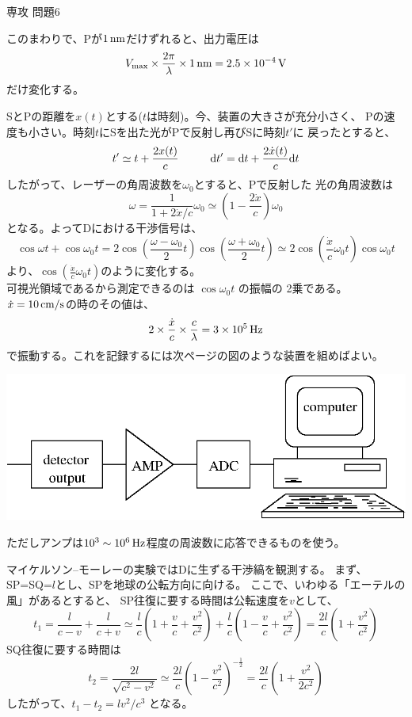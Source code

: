 \documentclass[fleqn]{jbook}
\begin{document}
\begin{answer}{専攻 問題6}{}
\begin{subanswers}
  このまわりで、Pが$1\,{\rm nm}$だけずれると、出力電圧は
%
  \[ V_{\rm max} \times \frac{2\pi}{\lambda} 
     \times 1\,{\rm nm} = 2.5\times 10^{-4} \,{\rm V} \]
%
  だけ変化する。 



\SubAnswer
  SとPの距離を$x(t)$とする($t$は時刻)。今、装置の大きさが充分小さく、
  Pの速度も小さい。時刻$t$にSを出た光がPで反射し再びSに時刻$t'$に
  戻ったとすると、
%
  \[ t' \simeq t + \frac{2x(t)}{c} \hspace{10mm}%
     \d{t}' = \d{t}+\frac{2\dot{x}(t)}{c}\d{t} \]
%
  したがって、レーザーの角周波数を$\omega_{0}$とすると、Pで反射した
  光の角周波数は
%
  \[ \omega = \frac{1}{1+2\dot{x}/c} \omega_{0} \simeq%
              \left(1-\frac{2\dot{x}}{c} \right) \omega_{0} \]
%
  となる。よってDにおける干渉信号は、
%
  \[ \cos \omega t + \cos \omega_{0} t%
       = 2\cos{\left(\frac{\omega-\omega_{0}}{2}t\right)}%
          \cos{\left(\frac{\omega+\omega_{0}}{2}t\right)}%
  \simeq 2\cos{\left(\frac{\dot{x}}{c}\omega_{0}t\right)}%
          \cos{\omega_{0}t} \]
%
  より、$\cos{(\frac{\dot{x}}{c}\omega_{0}t)}$のように変化する。\\
%
  可視光領域であるから測定できるのは $\cos{\omega_0 t}$ の振幅の
  2乗である。$\dot{x}=10\,{\rm cm/s}$の時のその値は、
%
  \[ 2 \times \frac{\dot{x}}{c} \times \frac{c}{\lambda}%
     = 3\Keta{5} \Unit{Hz} \]
%
  で振動する。これを記録するには次ページの図のような装置を組めばよい。
%
  \begin{center}
    \mbox{\includegraphics[clip]{1993phy6-3.eps}}
  \end{center}
%
  ただしアンプは$10^3\sim 10^6\,{\rm Hz}$程度の周波数に応答できるものを使う。


\SubAnswer
  マイケルソン--モーレーの実験ではDに生ずる干渉縞を観測する。
  まず、SP=SQ=$l$とし、SPを地球の公転方向に向ける。
  ここで、いわゆる「エーテルの風」があるとすると、
  SP往復に要する時間は公転速度を$v$として、
%
  \[ t_{1} = \frac{l}{c-v} + \frac{l}{c+v}%
     \simeq \frac{l}{c}\left(1+\frac{v}{c}+\frac{v^2}{c^2}\right)%
     + \frac{l}{c} \left( 1 - \frac{v}{c} + \frac{v^2}{c^2} \right)%
     = \frac{2l}{c}\left(1+\frac{v^2}{c^2}\right) \]
%
  SQ往復に要する時間は
%
  \[ t_{2} = \frac{2l}{\sqrt{c^2-v^2}}%
     \simeq \frac{2l}{c}\left(1-\frac{v^2}{c^2}\right)^{-\frac{1}{2}}%
     = \frac{2l}{c} \left( 1+\frac{v^2}{2c^2} \right) \]
%
  したがって、$t_{1}-t_{2}=lv^2/c^3$ となる。


\end{subanswers}
\end{answer}
\end{document}
